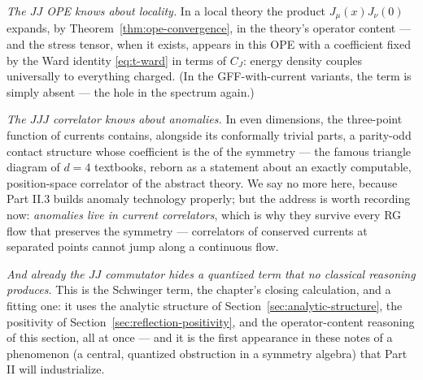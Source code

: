 \emph{The $JJ$ OPE knows about locality.} In a local theory the product
$J_\mu(x) J_\nu(0)$ expands, by Theorem~\ref{thm:ope-convergence}, in the
theory's operator content --- and the stress tensor, when it exists, appears
in this OPE with a coefficient fixed by the Ward identity
\eqref{eq:t-ward} in terms of $C_J$: energy density couples universally to
everything charged. (In the GFF-with-current variants, the term is simply
absent --- the hole in the spectrum again.)

\emph{The $JJJ$ correlator knows about anomalies.} In even dimensions, the
three-point function of currents contains, alongside its conformally trivial
parts, a parity-odd contact structure whose coefficient is the  of the symmetry --- the famous triangle diagram of $d=4$
textbooks, reborn as a statement about an exactly computable, position-space
correlator of the abstract theory. We say no more here, because Part II.3
builds anomaly technology properly; but the address is worth recording now:
\emph{anomalies live in current correlators}, which is why they survive every
RG flow that preserves the symmetry --- correlators of conserved currents at
separated points cannot jump along a continuous flow.

\emph{And already the $JJ$ commutator hides a quantized term that no
classical reasoning produces.} This is the Schwinger term, the chapter's
closing calculation, and a fitting one: it uses the analytic structure of
Section~\ref{sec:analytic-structure}, the positivity of
Section~\ref{sec:reflection-positivity}, and the operator-content reasoning
of this section, all at once --- and it is the first appearance in these
notes of a phenomenon (a central, quantized obstruction in a symmetry
algebra) that Part II will industrialize.

